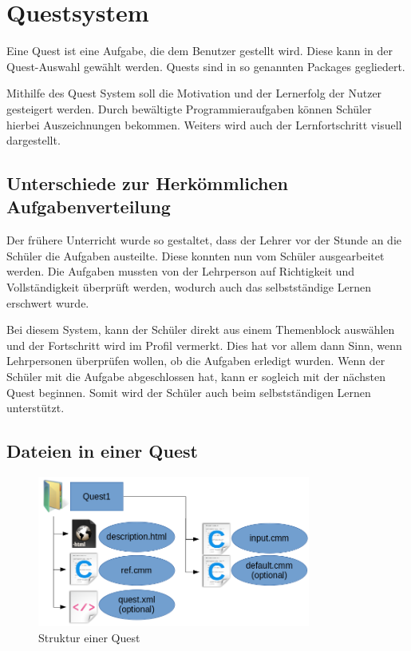 \chapter{Questsystem}
Eine Quest ist eine Aufgabe, die dem Benutzer gestellt wird. Diese kann in der Quest-Auswahl gewählt werden. Quests sind in so genannten Packages gegliedert. 

Mithilfe des Quest System soll die Motivation und der Lernerfolg der Nutzer gesteigert werden. Durch bewältigte Programmieraufgaben können Schüler hierbei Auszeichnungen bekommen. Weiters wird auch der Lernfortschritt visuell dargestellt.


\section{Unterschiede zur Herkömmlichen Aufgabenverteilung}
Der frühere Unterricht wurde so gestaltet, dass der Lehrer vor der Stunde an die Schüler die Aufgaben austeilte. Diese konnten nun vom Schüler ausgearbeitet werden. Die Aufgaben mussten von der Lehrperson auf Richtigkeit und Vollständigkeit überprüft werden, wodurch auch das selbstständige Lernen erschwert wurde.

Bei diesem System, kann der Schüler direkt aus einem Themenblock auswählen und der Fortschritt wird im Profil vermerkt. Dies hat vor allem dann Sinn, wenn Lehrpersonen überprüfen wollen, ob die Aufgaben erledigt wurden. Wenn der Schüler mit die Aufgabe abgeschlossen hat, kann er sogleich mit der nächsten Quest beginnen. Somit wird der Schüler auch beim selbstständigen Lernen unterstützt.

\section{Dateien in einer Quest}
\begin{figure}[h] 
  \centering
     \includegraphics[width=0.8\textwidth]{./media/images/quest/quest_ordnerstruktur}
  \caption{Struktur einer Quest}
  \label{fig:struct_quest}
\end{figure}

